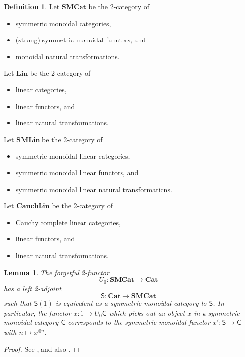 \documentclass[12pt,reqno]{amsart}
\theoremstyle{plain}
\newtheorem{lem}[thm]{Lemma}
\theoremstyle{definition}
\newtheorem{defn}[thm]{Definition}
\theoremstyle{remark}
\newcommand{\maps}{\colon}
\newcommand{\category}[1]{\mathsf{#1}}
\newcommand{\C}{\category C}
\renewcommand{\S}{\category S}
\newcommand{\SMC}{\namedbicat{SMCat}}
\newcommand{\SMLin}{\namedbicat{SMLin}}
\newcommand{\namedbicat}[1]{\mathbf{#1}}
\newcommand{\CCat}{\namedbicat{Cat}}
\newcommand{\Lin}{\namedbicat{Lin}}
\newcommand{\Cauch}{\namedbicat{Cauch}}
\numberwithin{thm}{section}
\begin{document}
\begin{defn}
\label{defn:CauchLin}
Let $\SMC$ be the 2-category of 
\begin{itemize}
    \item symmetric monoidal categories, 
    \item (strong) symmetric monoidal functors, and 
    \item monoidal natural transformations.
\end{itemize}
Let $\Lin$ be the 2-category of
\begin{itemize}
    \item linear categories, 
    \item linear functors, and
    \item linear natural transformations.
\end{itemize}
Let $\SMLin$ be the 2-category of 
\begin{itemize}
    \item symmetric monoidal linear categories, 
     \item symmetric monoidal linear functors, and
    \item symmetric monoidal linear natural transformations.
\end{itemize}
Let $\Cauch\Lin$ be the 2-category of 
\begin{itemize}
    \item Cauchy complete linear categories, 
    \item linear functors, and 
    \item linear natural transformations. 
\end{itemize}
\end{defn}

\begin{lem}
\label{lem:freeSMC}
    The forgetful 2-functor
    \[ 
        U_0 \maps \SMC \to \CCat 
    \]
    has a left 2-adjoint
    \[  
        \S \maps \CCat \to \SMC 
    \]
    such that $\S(1)$ is equivalent as a symmetric monoidal category to $\S$. In particular, the functor $x \maps 1 \to U_0\C$ which picks out an object $x$ in a symmetric monoidal category $\C$ corresponds to the symmetric monoidal functor $x' \maps \S \to \C$ with $n \mapsto x^{\otimes n}$.
\end{lem}
\begin{proof}
    See \cite{2-dimmonadtheory}, and also \cite[Sec.\ 4.1]{GeneralisedSpecies}. 
\end{proof}
\end{document}
